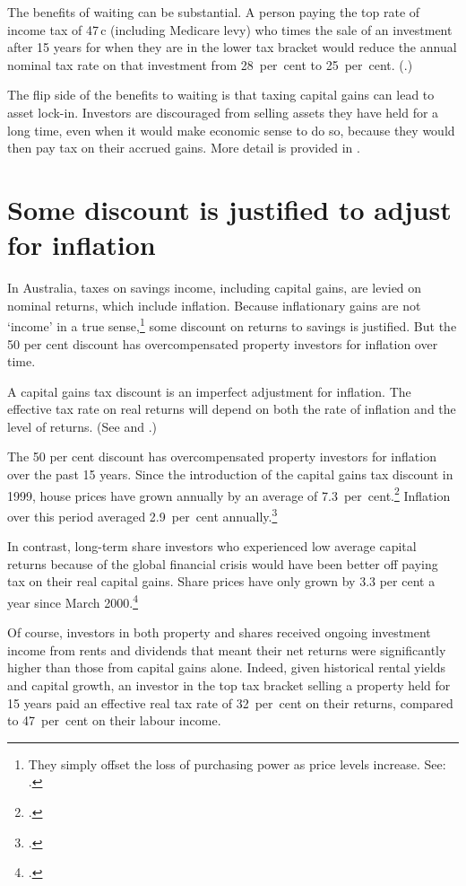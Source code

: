 The benefits of waiting can be substantial. A person paying the top rate of income tax of 47\,c (including Medicare levy) who times the sale of an investment after 15 years for when they are in the lower tax bracket would reduce the annual nominal tax rate on that investment from 28~per~cent to 25~per~cent. (.)

The flip side of the benefits to waiting is that taxing capital gains can lead to asset lock-in. Investors are discouraged from selling assets they have held for a long time, even when it would make economic sense to do so,  because they would then pay tax on their accrued gains. More detail is provided in .  


\section{Some discount is justified to adjust for inflation}
In Australia, taxes on savings income, including capital gains, are levied on nominal returns, which include inflation. Because inflationary gains are not `income' in a true sense,\footnote{They simply offset the loss of purchasing power as price levels increase. See: \textcite[][58]{Treasury2015ReThink}.}  some discount on returns to savings is justified. But the 50 per cent discount has overcompensated property investors for inflation over time. 

A capital gains tax discount is an imperfect adjustment for inflation. The effective tax rate on real returns will depend on both the rate of inflation and the level of returns. (See  and .)

The 50 per cent discount has overcompensated property investors for inflation over the past 15 years. Since the introduction of the capital gains tax discount in 1999, house prices have grown annually by an average of 7.3~per~cent.\footcite{ABS2015HousingFinance} Inflation over this period averaged 2.9~per~cent annually.\footcite{ABSVariousyearsCPI}

In contrast, long-term share investors who experienced low average capital returns because of the global financial crisis would have been better off paying tax on their real capital gains. Share prices have only grown by 3.3 per cent a year since March 2000.\footcite{Finance2015}

Of course, investors in both property and shares received ongoing investment income from rents and dividends that meant their net returns were significantly higher than those from capital gains alone. Indeed, given historical rental yields and capital growth, an investor in the top tax bracket selling a property held for 15 years paid an effective real tax rate of 32~per~cent on their returns, compared to 47~per~cent on their labour income.

